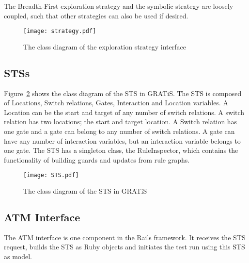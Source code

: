 The Breadth-First exploration strategy and the symbolic strategy are loosely coupled, such that other strategies can also be used if desired.
 
\begin{figure}[ht]
  \begin{center}
    \texttt{[image: strategy.pdf]}
  \end{center}
  \caption{The class diagram of the exploration strategy interface}
  \label{fig:esi-diagram}
\end{figure}

\subsection{STSs}\label{sec:sts-setup}
Figure~\ref{fig:sts-diagram} shows the class diagram of the STS in GRATiS. The STS is composed of Locations, Switch relations, Gates, Interaction and Location variables. A Location can be the start and target of any number of switch relations. A switch relation has two locations; the start and target location. A Switch relation has one gate and a gate can belong to any number of switch relations. A gate can have any number of interaction variables, but an interaction variable belongs to one gate. The STS has a singleton class, the RuleInspector, which contains the functionality of building guards and updates from rule graphs.

\begin{figure}[ht]
  \begin{center}
    \texttt{[image: STS.pdf]}
  \end{center}
  \caption{The class diagram of the STS in GRATiS}
  \label{fig:sts-diagram}
\end{figure}

\subsection{ATM Interface}
The ATM interface is one component in the Rails framework. It receives the STS request, builds the STS as Ruby objects and initiates the test run using this STS as model.